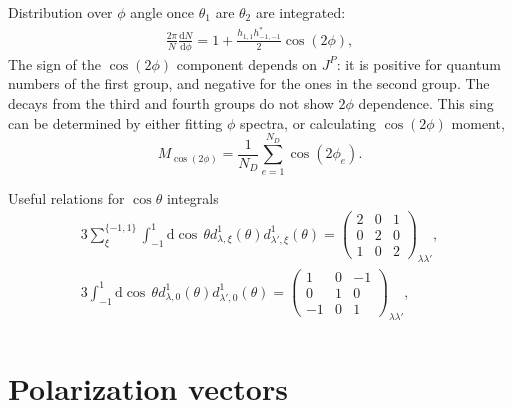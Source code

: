 \documentclass[prd,preprintnumbers,floatfix,
nofootinbib,superscriptaddress]{revtex4}
\newcommand{\diff}{\mathrm{d}}
\begin{document}
Distribution over $\phi$ angle once $\theta_1$ are $\theta_2$ are integrated:
\begin{align}
  \frac{2\pi}{N}\frac{\diff N}{\diff \phi} = 1
   + \frac{h_{1,1} h_{-1,-1}^*}{2} \cos(2 \phi),
\end{align}
The sign of the $\cos(2\phi)$ component depends on $J^P$: it is positive for quantum numbers of the first group, and negative for the ones in the second group.
The decays from the third and fourth groups do not show $2\phi$ dependence.
This sing can be determined by either fitting $\phi$ spectra, or calculating $\cos(2\phi)$ moment,
\begin{equation}
  M_{\cos(2\phi)} = \frac{1}{N_D}\sum_{e=1}^{N_D} \cos(2\phi_e).
\end{equation}

Useful relations for $\cos\theta$ integrals
\begin{align}
  3 \sum_{\xi}^{\{-1,1\}} \int_{-1}^{1} \diff \cos\,\theta d_{\lambda,\xi}^{1}(\theta) d_{\lambda',\xi}^{1}(\theta) =
  \begin{pmatrix}2 & 0 & 1\\0 & 2 & 0\\1 & 0 & 2\end{pmatrix}_{\lambda\lambda'},\\
  3 \int_{-1}^{1} \diff \cos\,\theta d_{\lambda,0}^{1}(\theta) d_{\lambda',0}^{1}(\theta) =
  \begin{pmatrix}1 & 0 & -1\\0 & 1 & 0\\-1 & 0 & 1\end{pmatrix}_{\lambda\lambda'},\\
\end{align}

\appendix

\section{Polarization vectors}
\end{document}
